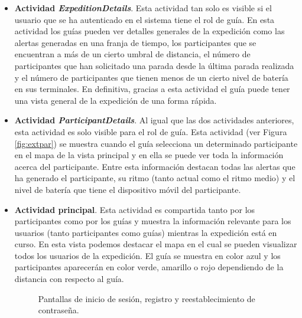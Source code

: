 \begin{itemize}
\item \textbf{Actividad \textit{ExpeditionDetails}}. Esta actividad tan solo es visible si el usuario que se ha autenticado en el sistema tiene el rol de guía. En esta actividad los guías pueden ver detalles generales de la expedición como las alertas generadas en una franja de tiempo, los participantes que se encuentran a más de un cierto umbral de distancia, el número de participantes que han solicitado una parada desde la última parada realizada y el número de participantes que tienen menos de un cierto nivel de batería en sus terminales. En definitiva, gracias a esta actividad el guía puede tener una vista general de la expedición de una forma rápida.

\item \textbf{Actividad \textit{ParticipantDetails}}. Al igual que las dos actividades anteriores, esta actividad es solo visible para el rol de guía. Esta actividad (ver Figura \ref{fig:extpar}) se muestra cuando el guía selecciona un determinado participante en el mapa de la vista principal y en ella se puede ver toda la información acerca del participante. Entre esta información destacan todas las alertas que ha generado el participante, su ritmo (tanto actual como el ritmo medio) y el nivel de batería que tiene el dispositivo móvil del participante.

\item \textbf{Actividad principal}. Esta actividad es compartida tanto por los participantes como por los guías y muestra la información relevante para los usuarios (tanto participantes como guías) mientras la expedición está en curso. En esta vista podemos destacar el mapa en el cual se pueden visualizar todos los usuarios de la expedición. El guía se muestra en color azul y los participantes aparecerán en color verde, amarillo o rojo dependiendo de la distancia con respecto al guía.

\begin{figure}
 \centering
    
  \caption{Pantallas de inicio de sesión, registro y reestablecimiento de contraseña.}
  \label{fig:fig1}
\end{figure}


\end{itemize}
